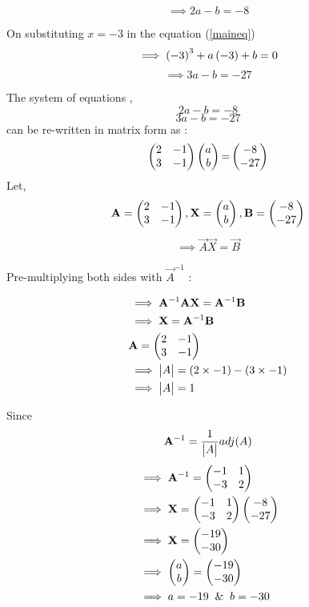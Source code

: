 \documentclass[journal,12pt,twocolumn]{IEEEtran}
\DeclareMathOperator*{\equals}{=}
\begin{document}
    \begin{equation}
    \label{eq1}
        \implies 2a-b=-8
    \end{equation}

    On substituting $x=-3$ in the equation (\ref{maineq})$$\implies \left(-3\right)^3+a\left(-3\right)+b=0$$
    \begin{equation}
    \label{eq2}
        \implies 3a-b=-27
    \end{equation}
    
    The system of equations ,
    $$2a-b=-8$$
    $$3a-b=-27$$
    can be re-written in matrix form as :
    $$\myvec{2&-1\\3&-1}\myvec{a\\b}\equals\myvec{-8\\-27}$$
    Let,
    $$\mathbf{A}=\begin{pmatrix}2&-1\\3&-1\end{pmatrix} , \mathbf{X}=\begin{pmatrix}a\\b\end{pmatrix} , \mathbf{B}=\begin{pmatrix}-8\\-27\end{pmatrix}$$
    \begin{align*}
        \implies \vec{A}\vec{X}=\vec{B}
    \end{align*}
    
    
        Pre-multiplying both sides with $\vec{A}^{-1}$ :
        
    \begin{align*}
        &\implies\mathbf{A}^{-1}\mathbf{A}\mathbf{X}=\mathbf{A}^{-1}\mathbf{B}\\
        &\implies\mathbf{X}=\mathbf{A}^{-1}\mathbf{B}\\
        &\mathbf{A}=\begin{pmatrix}2&-1\\3&-1\end{pmatrix}\\
        &\implies\begin{vmatrix}A\end{vmatrix}=(2\times -1)-(3\times-1)\\
        &\implies\begin{vmatrix}A\end{vmatrix}=1\\
    \end{align*}
    
    
    Since  $$\mathbf{A}^{-1}=\frac{1}{\begin{vmatrix}A\end{vmatrix}}adj(A)$$
    \begin{align*}
        &\implies\vec{A}^{-1}=\myvec{-1&1\\-3&2}\\
        &\implies\vec{X}=\myvec{-1&1\\-3&2}\myvec{-8\\-27}\\
        &\implies\vec{X}=\myvec{-19\\-30}\\
        &\implies\myvec{a\\b}=\myvec{-19\\-30}\\
        &\implies a=-19 \And b=-30\\
    \end{align*}
    
\end{document}
